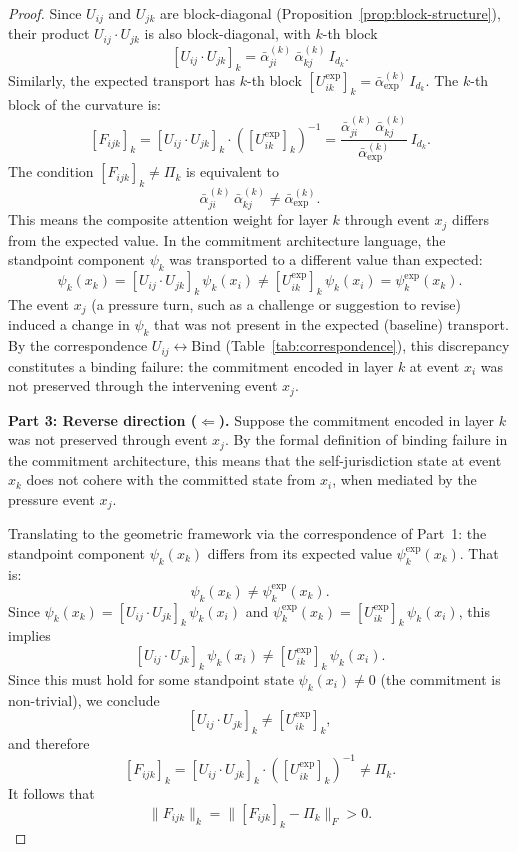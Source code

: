 \begin{proof}
Since $U_{ij}$ and $U_{jk}$ are block-diagonal (Proposition~\ref{prop:block-structure}),
their product $U_{ij} \cdot U_{jk}$ is also block-diagonal, with $k$-th block
\[
    [U_{ij} \cdot U_{jk}]_k = \bar{\alpha}_{ji}^{(k)}\, \bar{\alpha}_{kj}^{(k)}\,
    I_{d_k}.
\]
Similarly, the expected transport has $k$-th block $[U_{ik}^{\exp}]_k =
\bar{\alpha}^{(k)}_{\exp}\, I_{d_k}$. The $k$-th block of the curvature is:
\[
    [F_{ijk}]_k = [U_{ij} \cdot U_{jk}]_k \cdot ([U_{ik}^{\exp}]_k)^{-1}
    = \frac{\bar{\alpha}_{ji}^{(k)}\, \bar{\alpha}_{kj}^{(k)}}
           {\bar{\alpha}^{(k)}_{\exp}}\, I_{d_k}.
\]
The condition $[F_{ijk}]_k \neq \Pi_k$ is equivalent to
\[
    \bar{\alpha}_{ji}^{(k)}\, \bar{\alpha}_{kj}^{(k)} \neq \bar{\alpha}^{(k)}_{\exp}.
\]
This means the composite attention weight for layer $k$ through event $x_j$ differs from
the expected value. In the commitment architecture language, the standpoint component
$\psi_k$ was transported to a different value than expected:
\[
    \psi_k(x_k) = [U_{ij} \cdot U_{jk}]_k\, \psi_k(x_i)
    \neq [U_{ik}^{\exp}]_k\, \psi_k(x_i) = \psi_k^{\exp}(x_k).
\]
The event $x_j$ (a pressure turn, such as a challenge or suggestion to revise) induced a
change in $\psi_k$ that was not present in the expected (baseline) transport. By the
correspondence $U_{ij} \leftrightarrow \mathrm{Bind}$ (Table~\ref{tab:correspondence}),
this discrepancy constitutes a binding failure: the commitment encoded in layer $k$ at
event $x_i$ was not preserved through the intervening event $x_j$.

\medskip\noindent\textbf{Part 3: Reverse direction ($\Leftarrow$).}
Suppose the commitment encoded in layer $k$ was not preserved through event $x_j$. By the
formal definition of binding failure in the commitment architecture, this means that the
self-jurisdiction state at event $x_k$ does not cohere with the committed state from
$x_i$, when mediated by the pressure event $x_j$.

Translating to the geometric framework via the correspondence of Part~1: the standpoint
component $\psi_k(x_k)$ differs from its expected value $\psi_k^{\exp}(x_k)$. That is:
\[
    \psi_k(x_k) \neq \psi_k^{\exp}(x_k).
\]
Since $\psi_k(x_k) = [U_{ij} \cdot U_{jk}]_k\, \psi_k(x_i)$ and $\psi_k^{\exp}(x_k) =
[U_{ik}^{\exp}]_k\, \psi_k(x_i)$, this implies
\[
    [U_{ij} \cdot U_{jk}]_k\, \psi_k(x_i) \neq [U_{ik}^{\exp}]_k\, \psi_k(x_i).
\]
Since this must hold for some standpoint state $\psi_k(x_i) \neq 0$ (the commitment is
non-trivial), we conclude
\[
    [U_{ij} \cdot U_{jk}]_k \neq [U_{ik}^{\exp}]_k,
\]
and therefore
\[
    [F_{ijk}]_k = [U_{ij} \cdot U_{jk}]_k \cdot ([U_{ik}^{\exp}]_k)^{-1} \neq \Pi_k.
\]
It follows that
\[
    \|F_{ijk}\|_k = \big\|[F_{ijk}]_k - \Pi_k\big\|_F > 0.
\]


\end{proof}

